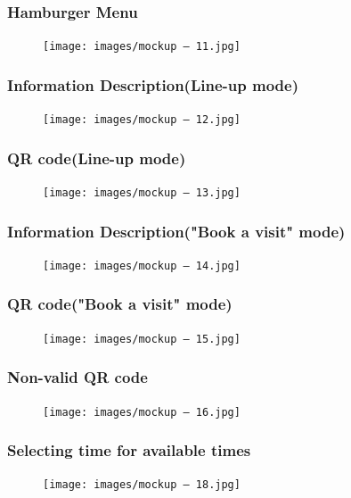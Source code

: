 \subsubsection{Hamburger Menu}
\begin{figure}[H]
  \centering
  \texttt{[image: images/mockup – 11.jpg]}
\end{figure}

\subsubsection{Information Description(Line-up mode) }
\begin{figure}[H]
  \centering
  \texttt{[image: images/mockup – 12.jpg]}
\end{figure}

\subsubsection{QR code(Line-up mode) }
\begin{figure}[H]
  \centering
  \texttt{[image: images/mockup – 13.jpg]}
\end{figure}

\subsubsection{Information Description("Book a visit" mode)}
\begin{figure}[H]
  \centering
  \texttt{[image: images/mockup – 14.jpg]}
\end{figure}

\subsubsection{QR code("Book a visit" mode)}
\begin{figure}[H]
  \centering
  \texttt{[image: images/mockup – 15.jpg]}
\end{figure}

\subsubsection{Non-valid QR code}
\begin{figure}[H]
  \centering
  \texttt{[image: images/mockup – 16.jpg]}
\end{figure}

\subsubsection{Selecting time for available times}
\begin{figure}[H]
  \centering
  \texttt{[image: images/mockup – 18.jpg]}
\end{figure}

